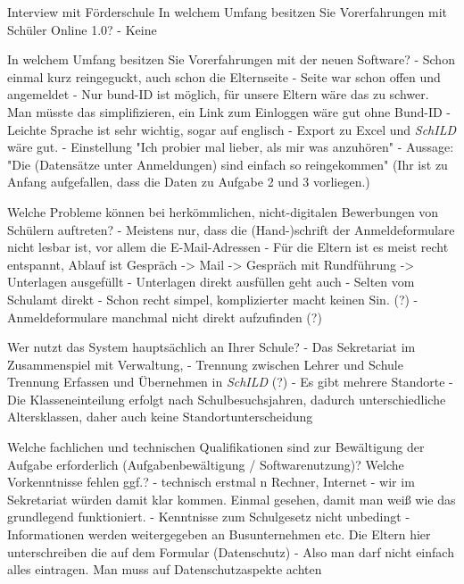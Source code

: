 Interview mit Förderschule
In welchem Umfang besitzen Sie Vorerfahrungen mit Schüler Online 1.0? 		
- Keine

In welchem Umfang besitzen Sie Vorerfahrungen mit der neuen Software?		
- Schon einmal kurz reingeguckt, auch schon die Elternseite
- Seite war schon offen und angemeldet	
- Nur bund-ID ist möglich, für unsere Eltern wäre das zu schwer. Man müsste das simplifizieren, ein Link zum Einloggen wäre gut ohne Bund-ID
- Leichte Sprache ist sehr wichtig, sogar auf englisch
- Export zu Excel und \textit{SchILD} wäre gut.
- Einstellung "Ich probier mal lieber, als mir was anzuhören"
- Aussage: "Die (Datensätze unter Anmeldungen) sind einfach so reingekommen" (Ihr ist zu Anfang aufgefallen, dass die Daten zu Aufgabe 2 und 3 vorliegen.)



Welche Probleme können bei herkömmlichen, nicht-digitalen Bewerbungen von Schülern auftreten?
- Meistens nur, dass die (Hand-)schrift der Anmeldeformulare nicht lesbar ist, vor allem die E-Mail-Adressen
- Für die Eltern ist es meist recht entspannt, Ablauf ist Gespräch -> Mail -> Gespräch mit Rundführung -> Unterlagen ausgefüllt
- Unterlagen direkt ausfüllen geht auch
- Selten vom Schulamt direkt
- Schon recht simpel, komplizierter macht keinen Sin. (?)
- Anmeldeformulare manchmal nicht direkt aufzufinden (?)



Wer nutzt das System hauptsächlich an Ihrer Schule?
- Das Sekretariat im Zusammenspiel mit Verwaltung, 
- Trennung zwischen Lehrer und Schule Trennung Erfassen und Übernehmen in \textit{SchILD} (?)
- Es gibt mehrere Standorte	
- Die Klasseneinteilung erfolgt nach Schulbesuchsjahren, dadurch unterschiedliche Altersklassen, daher auch keine Standortunterscheidung




Welche fachlichen und technischen Qualifikationen sind zur Bewältigung der Aufgabe erforderlich (Aufgabenbewältigung / Softwarenutzung)? Welche Vorkenntnisse fehlen ggf.?
- technisch erstmal n Rechner, Internet
- wir im Sekretariat würden damit klar kommen. Einmal gesehen, damit man weiß wie das grundlegend funktioniert.
- Kenntnisse zum Schulgesetz nicht unbedingt
- Informationen werden weitergegeben an Busunternehmen etc. Die Eltern hier unterschreiben die auf dem Formular (Datenschutz)
- Also man darf nicht einfach alles eintragen. Man muss auf Datenschutzaspekte achten





